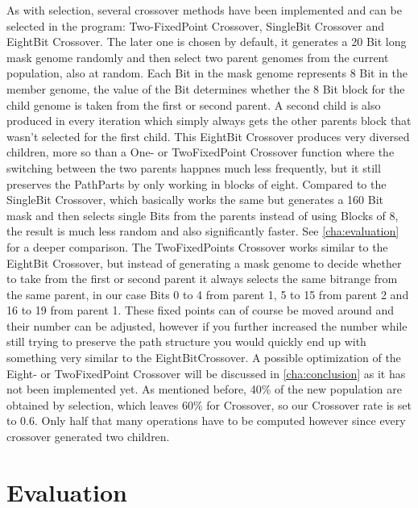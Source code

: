 As with selection, several crossover methods have been implemented and can be selected in the program: Two-FixedPoint Crossover, SingleBit Crossover and EightBit Crossover. The later one is chosen by default, it generates a 20 Bit long mask genome randomly and then select two parent genomes from the current population, also at random. Each Bit in the mask genome represents 8 Bit in the member genome, the value of the Bit determines whether the 8 Bit block for the child genome is taken from the first or second parent. A second child is also produced in every iteration which simply always gets the other parents block that wasn't selected for the first child. This EightBit Crossover produces very diversed children, more so than a One- or TwoFixedPoint Crossover function where the switching between the two parents happnes much less frequently, but it still preserves the PathParts by only working in blocks of eight. Compared to the SingleBit Crossover, which basically works the same but generates a 160 Bit mask and then selects single Bits from the parents instead of using Blocks of 8, the result is much less random and also significantly faster. See \ref{cha:evaluation} for a deeper comparison.
The TwoFixedPoints Crossover works similar to the EightBit Crossover, but instead of generating a mask genome to decide whether to take from the first or second parent it always selects the same bitrange from the same parent, in our case Bits 0 to 4 from parent 1, 5 to 15 from parent 2 and 16 to 19 from parent 1. These fixed points can of course be moved around and their number can be adjusted, however if you further increased the number while still trying to preserve the path structure you would quickly end up with something very similar to the EightBitCrossover.
A possible optimization of the Eight- or TwoFixedPoint Crossover will be discussed in \ref{cha:conclusion} as it has not been implemented yet.
As mentioned before, 40\% of the new population are obtained by selection, which leaves 60\% for Crossover, so our Crossover rate is set to 0.6. Only half that many operations have to be computed however since every crossover generated two children.

\section{Evaluation} %
\label{sec:evaluation}

